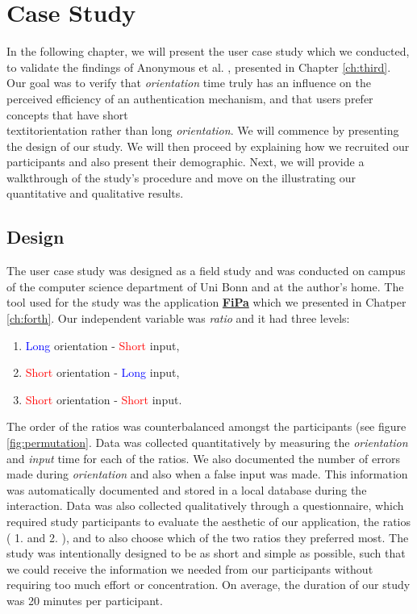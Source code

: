 
\chapter{Case Study}\label{ch:fifth}

In the following chapter, we will present the user case study which we conducted, to validate the findings of Anonymous et al. \cite{anonymous}, presented in Chapter \ref{ch:third}. Our goal was to verify that \textit{orientation} time truly has an influence on the perceived efficiency of an authentication mechanism, and that users prefer concepts that have short \\textit{orientation} rather than long \textit{orientation}. We will commence by presenting the design of our study. We will then proceed by explaining how we recruited our participants and also present their demographic. Next, we will provide a walkthrough of the study's procedure and move on the illustrating our quantitative and qualitative results.  

\section{Design}

The user case study was designed as a field study and was conducted on campus of the computer science department of Uni Bonn and at the author's home. The tool used for the study was the application \underline{\textbf{FiPa}} which we presented in Chatper \ref{ch:forth}. Our independent variable was \textit{ratio} and it had three levels:
\begin{enumerate}
    \item \textcolor{blue}{Long} orientation - \textcolor{red}{Short} input, 
    \item \textcolor{red}{Short} orientation - \textcolor{blue}{Long} input,
    \item \textcolor{red}{Short} orientation - \textcolor{red}{Short} input.
\end{enumerate}

The order of the ratios was counterbalanced amongst the participants (see figure \ref{fig:permutation}. Data was collected quantitatively by measuring the \textit{orientation} and \textit{input} time for each of the ratios. We also documented the number of errors made during \textit{orientation} and also when a false input was made. This information was automatically documented and stored in a local database during the interaction. Data was also collected qualitatively through a questionnaire, which required study participants to evaluate the aesthetic of our application, the ratios ( 1. and 2. ), and to also choose which of the two ratios they preferred most. The study was intentionally designed to be as short and simple as possible, such that we could receive the information we needed from our participants without requiring too much effort or concentration. On average, the duration of our study was 20 minutes per participant. 


